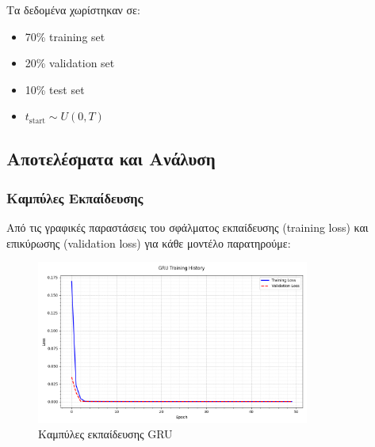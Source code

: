 \documentclass[a4paper,12pt]{article}
\begin{document}
Τα δεδομένα χωρίστηκαν σε:
\begin{itemize}
   \item 70\% training set
   \item 20\% validation set
   \item 10\% test set
\end{itemize}


\begin{itemize}
    \item $t_{\text{start}} \sim U(0,T)$
\end{itemize}


\subsection*{Αποτελέσματα και Ανάλυση}

\subsubsection*{Καμπύλες Εκπαίδευσης}

Από τις γραφικές παραστάσεις του σφάλματος εκπαίδευσης (training loss) και επικύρωσης (validation loss) για κάθε μοντέλο παρατηρούμε:

\begin{figure}[h]
\centering
\includegraphics[width=0.8\textwidth]{gru_loss.png}
\caption{Καμπύλες εκπαίδευσης GRU}
\label{fig:gru_history}
\end{figure}
\end{document}
